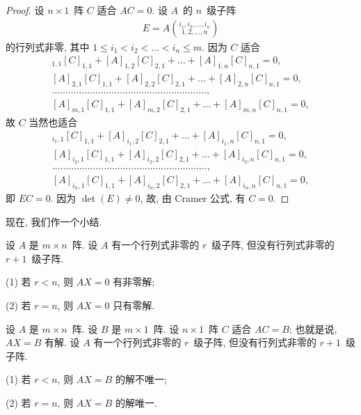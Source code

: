 \begin{proof}
    设 \(n \times 1\)~阵 \(C\) 适合 \(AC = 0\).
    设 \(A\)~的 \(n\)~级子阵
    \begin{align*}
        E = A\binom{i_1,i_2,\dots,i_n}{1,2,\dots,n}
    \end{align*}
    的行列式非零,
    其中
    \(1 \leq i_1 < i_2 < \dots < i_n \leq m\).
    因为 \(C\) 适合
    \begin{align*}
        [A]_{1,1} [C]_{1,1} + [A]_{1,2} [C]_{2,1}
        + \dots + [A]_{1,n} [C]_{n,1} = 0, \\
        [A]_{2,1} [C]_{1,1} + [A]_{2,2} [C]_{2,1}
        + \dots + [A]_{2,n} [C]_{n,1} = 0, \\
        \dots \dots \dots
        \dots \dots \dots \dots
        \dots \dots \dots \dots
        \dots \dots \dots \dots
        \dots \dots \dots \dots,
        \\
        [A]_{m,1} [C]_{1,1} + [A]_{m,2} [C]_{2,1}
        + \dots + [A]_{m,n} [C]_{n,1} = 0,
    \end{align*}
    故 \(C\) 当然也适合
    \begin{align*}
        [A]_{i_1,1} [C]_{1,1} + [A]_{i_1,2} [C]_{2,1}
        + \dots + [A]_{i_1,n} [C]_{n,1} = 0, \\
        [A]_{i_2,1} [C]_{1,1} + [A]_{i_2,2} [C]_{2,1}
        + \dots + [A]_{i_2,n} [C]_{n,1} = 0, \\
        \dots \dots \dots
        \dots \dots \dots \dots
        \dots \dots \dots \dots
        \dots \dots \dots \dots
        \dots \dots \dots \dots,
        \\
        [A]_{i_n,1} [C]_{1,1} + [A]_{i_n,2} [C]_{2,1}
        + \dots + [A]_{i_n,n} [C]_{n,1} = 0,
    \end{align*}
    即 \(EC = 0\).
    因为 \(\det {(E)} \neq 0\),
    故, 由 Cramer 公式,
    有 \(C = 0\).
\end{proof}

现在, 我们作一个小结.

\begin{theorem}
    设 \(A\) 是 \(m \times n\)~阵.
    设 \(A\) 有一个行列式非零的 \(r\)~级子阵,
    但没有行列式非零的 \(r+1\)~级子阵.

    (1)
    若 \(r < n\),
    则 \(AX = 0\) 有非零解;

    (2)
    若 \(r = n\),
    则 \(AX = 0\) 只有零解.
\end{theorem}

\begin{theorem}
    设 \(A\) 是 \(m \times n\)~阵.
    设 \(B\) 是 \(m \times 1\)~阵.
    设 \(n \times 1\)~阵 \(C\) 适合 \(AC = B\);
    也就是说, \(AX = B\) 有解.
    设 \(A\) 有一个行列式非零的 \(r\)~级子阵,
    但没有行列式非零的 \(r+1\)~级子阵.

    (1)
    若 \(r < n\),
    则 \(AX = B\) 的解不唯一;

    (2)
    若 \(r = n\),
    则 \(AX = B\) 的解唯一.
\end{theorem}

